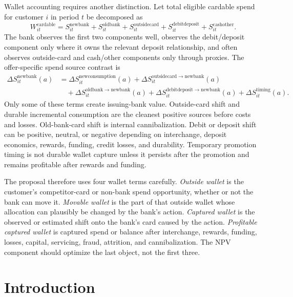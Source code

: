 \documentclass[11pt]{article}
\newcommand{\1}{\mathbf{1}}
\begin{document}
Wallet accounting requires another distinction. Let total eligible cardable
spend for customer $i$ in period $t$ be decomposed as
\begin{equation}
  W_{it}^{\mathrm{cardable}}
  =
  S_{it}^{\mathrm{newbank}}
  +S_{it}^{\mathrm{oldbank}}
  +S_{it}^{\mathrm{outsidecard}}
  +S_{it}^{\mathrm{debitdeposit}}
  +S_{it}^{\mathrm{cashother}}.
  \label{eq:wallet-accounting}
\end{equation}
The bank observes the first two components well, observes the debit/deposit
component only where it owns the relevant deposit relationship, and often
observes outside-card and cash/other components only through proxies. The
offer-specific spend source contrast is
\begin{align}
  \Delta S_{it}^{\mathrm{newbank}}(a)
  &=
  \Delta S_{it}^{\mathrm{newconsumption}}(a)
  +\Delta S_{it}^{\mathrm{outsidecard\rightarrow newbank}}(a)
  \nonumber\\
  &\quad
  +\Delta S_{it}^{\mathrm{oldbank\rightarrow newbank}}(a)
  +\Delta S_{it}^{\mathrm{debitdeposit\rightarrow newbank}}(a)
  +\Delta S_{it}^{\mathrm{timing}}(a).
  \label{eq:spend-source-panel}
\end{align}
Only some of these terms create issuing-bank value. Outside-card shift and
durable incremental consumption are the cleanest positive sources before
costs and losses. Old-bank-card shift is internal cannibalization. Debit or
deposit shift can be positive, neutral, or negative depending on interchange,
deposit economics, rewards, funding, credit losses, and durability. Temporary
promotion timing is not durable wallet capture unless it persists after the
promotion and remains profitable after rewards and funding.

The proposal therefore uses four wallet terms carefully. \emph{Outside wallet}
is the customer's competitor-card or non-bank spend opportunity, whether or
not the bank can move it. \emph{Movable wallet} is the part of that outside
wallet whose allocation can plausibly be changed by the bank's action.
\emph{Captured wallet} is the observed or estimated shift onto the bank's card
caused by the action. \emph{Profitable captured wallet} is captured spend or
balance after interchange, rewards, funding, losses, capital, servicing, fraud,
attrition, and cannibalization. The NPV component should optimize the last
object, not the first three.

\section{Introduction}
\end{document}
